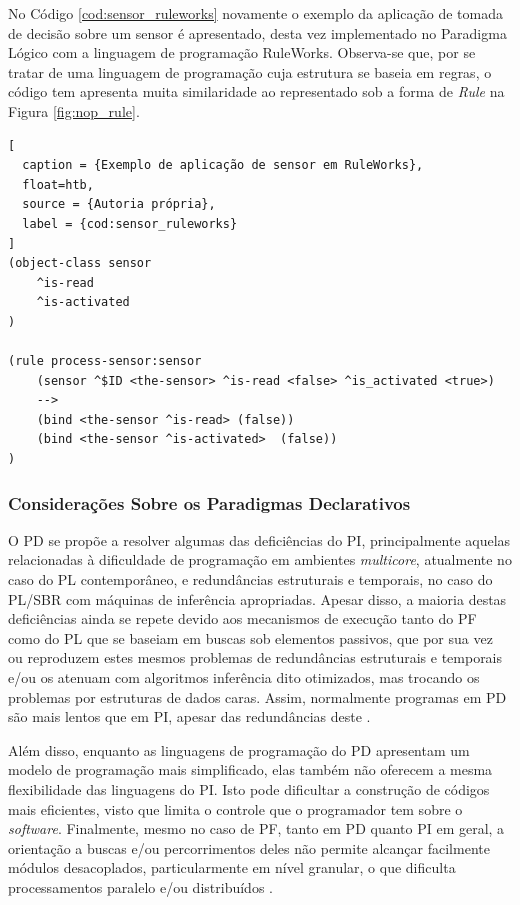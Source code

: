 No Código \ref{cod:sensor_ruleworks} novamente o exemplo da aplicação de tomada de
decisão sobre um sensor é apresentado, desta vez implementado no Paradigma
Lógico com a linguagem de programação RuleWorks. Observa-se que, por se tratar
de uma linguagem de programação cuja estrutura se baseia em regras, o código tem
apresenta muita similaridade ao representado sob a forma de \textit{Rule} na
Figura \ref{fig:nop_rule}.

\begin{lstlisting}[
  caption = {Exemplo de aplicação de sensor em RuleWorks},
  float=htb,
  source = {Autoria própria},
  label = {cod:sensor_ruleworks}
]
(object-class sensor
    ^is-read
    ^is-activated
)

(rule process-sensor:sensor
    (sensor ^$ID <the-sensor> ^is-read <false> ^is_activated <true>)
    -->
    (bind <the-sensor ^is-read> (false))
    (bind <the-sensor ^is-activated>  (false))
)
\end{lstlisting}

\subsubsection{Considerações Sobre os Paradigmas Declarativos}

O PD se propõe a resolver algumas das deficiências do PI, principalmente aquelas
relacionadas à dificuldade de programação em ambientes \textit{multicore},
atualmente no caso do PL contemporâneo, e redundâncias estruturais e temporais,
no caso do PL/SBR com máquinas de inferência apropriadas. Apesar disso, a
maioria destas deficiências ainda se repete devido aos mecanismos de execução
tanto do PF como do PL que se baseiam em buscas sob elementos passivos, que por
sua vez ou reproduzem estes mesmos problemas de redundâncias estruturais e
temporais e/ou os atenuam com algoritmos inferência dito otimizados, mas trocando
os problemas por estruturas de dados caras. Assim, normalmente programas em PD
são mais lentos que em PI, apesar das redundâncias deste
\cite{msc_Banaszewski_2009}.

Além disso, enquanto as linguagens de programação do PD apresentam um modelo de
programação mais simplificado, elas também não oferecem a mesma flexibilidade
das linguagens do PI. Isto pode dificultar a construção de códigos mais
eficientes, visto que limita o controle que o programador tem sobre o
\textit{software}. Finalmente, mesmo no caso de PF, tanto em PD quanto PI em
geral, a orientação a buscas e/ou percorrimentos deles não permite alcançar
facilmente módulos desacoplados, particularmente em nível granular, o que
dificulta processamentos paralelo e/ou distribuídos \cite{msc_Banaszewski_2009}.

